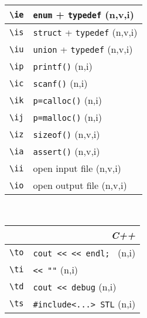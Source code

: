 \documentclass[oneside,11pt,landscape,DIV16]{scrartcl}
\begin{document}
\begin{multicols}{3}
\begin{center}
\begin{tabular}[]{|p{11mm}|p{60mm}|}
\hline \verb'\ie'  & \verb'enum'   + \verb'typedef'   \hfill (n,v,i)\\
\hline \verb'\is'  & \verb'struct' + \verb'typedef'   \hfill (n,v,i)\\
\hline \verb'\iu'  & \verb'union'  + \verb'typedef'   \hfill (n,v,i)\\
\hline \verb'\ip'  & \verb'printf()'                  \hfill (n,i)\\
\hline \verb'\ic' & \verb'scanf()'                   \hfill (n,i)\\
\hline \verb'\ik' & \verb'p=calloc()'                \hfill (n,i)\\
\hline \verb'\ij' & \verb'p=malloc()'                \hfill (n,i)\\
\hline \verb'\iz' & \verb'sizeof()'                  \hfill (n,v,i)\\
\hline \verb'\ia' & \verb'assert()'                  \hfill (n,v,i)\\
\hline \verb'\ii'  & open input file                  \hfill (n,v,i)\\
\hline \verb'\io'  & open output file                 \hfill (n,v,i)\\
\hline
\end{tabular}\\
%
%
%
%
\begin{tabular}[]{|p{12mm}|p{60mm}|}
\hline 
\multicolumn{2}{|r|}{\textsl{C\textbf{++}}} \\
\hline \verb'\to'  & \verb'cout << << endl; '                \hfill (n,i)\\
\hline \verb'\ti'   & \verb'<< ""'                \hfill (n,i)\\
\hline \verb'\td'   & \verb'cout << debug'                \hfill (n,i)\\
\hline \verb'\ts'  & \verb$#include<...> STL$                \hfill (n,i)\\

\end{tabular}
\end{center}
\end{multicols}
\end{document}
